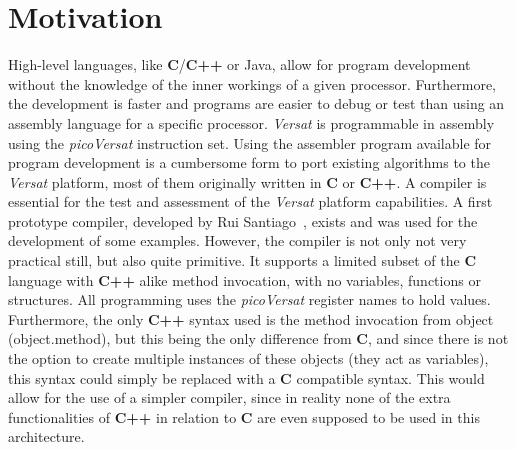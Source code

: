 

\section{Motivation}
\label{section:motiva}

High-level languages, like {\bf C}/{\bf C++} or Java, allow for program
development without the knowledge of the inner workings of a given
processor. Furthermore, the development is faster and programs are easier to
debug or test than using an assembly language for a specific processor. {\it
  Versat} is programmable in assembly using the {\it picoVersat} instruction
set. Using the assembler program available for program development is a
cumbersome form to port existing algorithms to the {\it Versat} platform, most
of them originally written in {\bf C} or {\bf C++}.  A compiler is essential for
the test and assessment of the {\it Versat} platform capabilities. A first
prototype compiler, developed by Rui Santiago~\cite{Santiago2016}, exists and
was used for the development of some examples. However, the compiler is not only
not very practical still, but also quite primitive. It supports a limited subset
of the {\bf C} language with {\bf C++} alike method invocation, with no
variables, functions or structures. All programming uses the {\it picoVersat}
register names to hold values. Furthermore, the only {\bf C++} syntax used is
the method invocation from object (object.method), but this being the only
difference from {\bf C}, and since there is not the option to create multiple
instances of these objects (they act as variables), this syntax could simply be
replaced with a {\bf C} compatible syntax. This would allow for the use of a
simpler compiler, since in reality none of the extra functionalities of {\bf
  C++} in relation to {\bf C} are even supposed to be used in this architecture.

